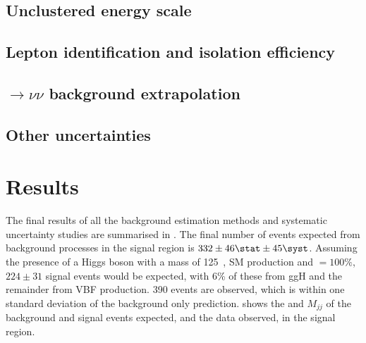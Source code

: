 \subsection{Unclustered energy scale}%
\label{sec:promptues}

\subsection{Lepton identification and isolation efficiency}%
\label{sec:promptlepweights}

\subsection{\PZ$\rightarrow\nu\nu$ background extrapolation}%
\label{sec:promptzextrap}

\subsection{Other uncertainties}%
\label{sec:promptzextrap}




\section{Results}%
\label{sec:promptresults}
The final results of all the background estimation methods and systematic uncertainty studies are summarised in . The final number of events expected from background processes in the signal region is $332\pm 46\stat\pm 45\syst$. Assuming the presence of a Higgs boson with a mass of 125 \GeV\,, \ac{SM} production and \BRinv$=100\%$, $224\pm 31$ signal events would be expected, with 6\% of these from \ac{ggH} and the remainder from \ac{VBF} production. 390 events are observed, which is within one standard deviation of the background only prediction.  shows the \MET and $M_{jj}$ of the background and signal events expected, and the data observed, in the signal region. 

